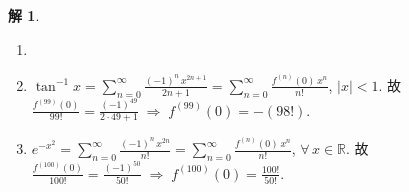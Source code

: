 \documentclass[12pt]{extarticle}
\newcommand{\ds}{\displaystyle}
\newcommand{\ie}{\;\Longrightarrow\;}
\theoremstyle{definition}
\newtheorem*{sol}{解}
\begin{document}
\begin{sol}
  \begin{enumerate}\setlength{\itemsep}{-1pt}
    \item[]
    \item $\ds\tan^{-1}x = \sum_{n = 0}^\infty\frac{(-1)^n\,x^{2n + 1}}{2 n + 1} = \sum_{n = 0}^\infty\frac{f^{(n)}(0)\,x^n}{n!}$, $|x| < 1$. 故 $\ds\frac{f^{(99)}(0)}{99!} = \frac{(-1)^{49}}{2\cdot 49 + 1} \ie f^{(99)}(0) = -(98!)$.
    \item $\ds e^{-x^2} = \sum_{n = 0}^\infty\frac{(-1)^n\,x^{2n}}{n!} = \sum_{n = 0}^\infty\frac{f^{(n)}(0)\,x^n}{n!}$, $\forall\,x\in\mathbb{R}$. 故 $\ds\frac{f^{(100)}(0)}{100!} = \frac{(-1)^{50}}{50!} \ie f^{(100)}(0) = \frac{100!}{50!}$.
  \end{enumerate}
\end{sol}
\end{document}
